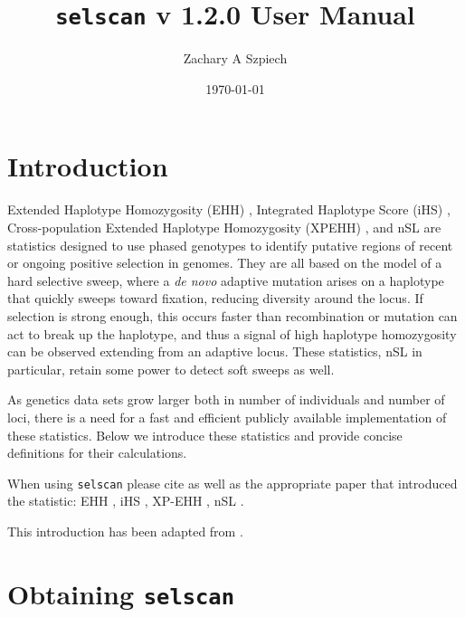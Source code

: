 \documentclass[12pt]{article}%
\title{{\tt selscan} v 1.2.0 User Manual}
\date{\today}
\author{Zachary A Szpiech}
\begin{document}
\lstset{breaklines=true,basicstyle=\ttfamily}

\null  %
\nointerlineskip  %
\vfill
\let\snewpage \newpage
\let\newpage \relax
\maketitle
\thispagestyle{empty}
\let \newpage \snewpage
\vfill 
\break %

\tableofcontents 

\newpage

\section{Introduction}

Extended Haplotype Homozygosity (EHH) \cite[]{SabetiEtAl02}, Integrated Haplotype 
Score (iHS) \cite[]{VoightEtAl06}, Cross-population Extended Haplotype 
Homozygosity (XPEHH) \cite[]{SabetiEtAl07}, and nSL \cite[]{FerrerAdmetllaEtAl14} are statistics designed to use phased genotypes to identify putative regions
of recent or ongoing positive selection in genomes.  They are all based on the model of 
a hard selective sweep, where a {\it de novo} adaptive mutation arises on a haplotype
that quickly sweeps toward fixation, reducing diversity around the locus.  If selection is strong enough, this occurs
faster than recombination or mutation can act to break up the haplotype, and thus a signal of high 
haplotype homozygosity can be observed extending from an adaptive locus.  These statistics, nSL in particular, retain some power to detect soft sweeps as well.

As genetics data sets grow larger both in number of individuals and number of loci,
there is a need for a fast and efficient publicly available implementation of these statistics. Below we 
introduce these statistics and provide concise definitions for their calculations.  

When using {\tt selscan} please cite \cite{SzpiechAndHernandez14} as well as the appropriate paper that introduced the statistic: EHH \cite[]{SabetiEtAl02}, iHS \cite[]{VoightEtAl06}, XP-EHH \cite[]{SabetiEtAl07}, nSL \cite[]{FerrerAdmetllaEtAl14}.

This introduction has been adapted from \cite{SzpiechAndHernandez14}.

\section{Obtaining {\tt selscan}}
\end{document}
